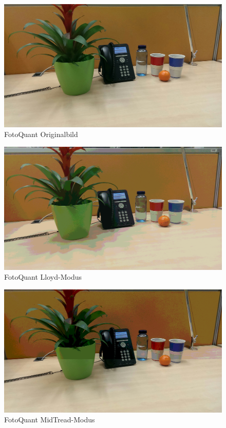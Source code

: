 \begin{landscape}

\begin{figure}[h]
	\centering
		\includegraphics[width=1.4\textwidth]{img/Fotos/FotoQuant_Original.jpg}
	\caption[FotoQuant Original]{FotoQuant Originalbild}
	\label{fig:quant_ori}
\end{figure}

\begin{figure}[h]
	\label{fig:quant_mid}
	\centering
		\includegraphics[width=1.4\textwidth]{img/Fotos/FotoQuant_Lloyd.jpg}
	\caption[FotoQuant Lloyd]{FotoQuant Lloyd-Modus}
	\label{fig:quant_lloyd}
\end{figure}

\begin{figure}[h]
	\centering
		\includegraphics[width=1.4\textwidth]{img/Fotos/FotoQuant_Midtread.jpg}
	\caption[FotoQuant MidTread]{FotoQuant MidTread-Modus}
	\label{fig:quant_mid}
\end{figure}


\end{landscape}
